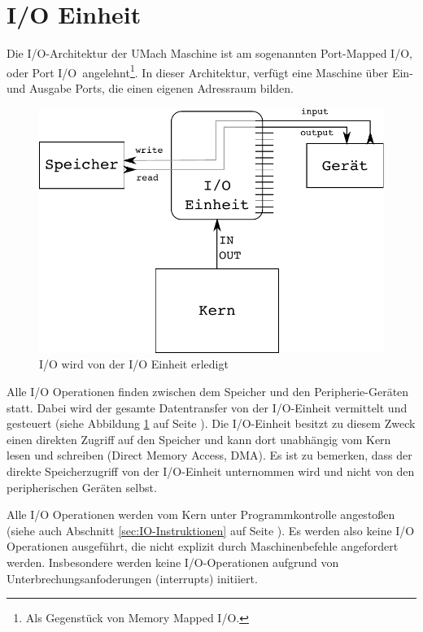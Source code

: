 \section{I/O Einheit}
\label{sec:IO-Einheit}

Die I/O-Architektur der UMach Maschine ist am sogenannten \glqq Port-Mapped
I/O\grqq, oder \glqq Port I/O\grqq\ angelehnt\footnote{Als Gegenstück von \glqq
Memory Mapped I/O\grqq.}. In dieser Architektur, verfügt eine Maschine über
Ein- und Ausgabe \glqq Ports\grqq, die einen eigenen Adressraum bilden.

\begin{figure}[htp]
 \centering
 \includegraphics{./img/UMach-IO-Prozess.pdf}
 \caption{I/O wird von der I/O Einheit erledigt}
 \label{fig:UMach-IO-Prozess}
\end{figure}

Alle I/O Operationen finden zwischen dem Speicher und den Peripherie-Geräten
statt. Dabei wird der gesamte Datentransfer von der I/O-Einheit vermittelt und
gesteuert (siehe Abbildung \ref{fig:UMach-IO-Prozess} auf Seite
\pageref{fig:UMach-IO-Prozess}). Die I/O-Einheit besitzt zu diesem Zweck einen
direkten Zugriff auf den Speicher und kann dort unabhängig vom Kern lesen und
schreiben (Direct Memory Access, DMA). Es ist zu bemerken, dass
der direkte Speicherzugriff von der I/O-Einheit unternommen wird und nicht von
den peripherischen Geräten selbst.

Alle I/O Operationen werden vom Kern unter Programmkontrolle angestoßen (siehe
auch Abschnitt \ref{sec:IO-Instruktionen} auf Seite
\pageref{sec:IO-Instruktionen}). Es werden also keine I/O Operationen
ausgeführt, die nicht explizit durch Maschinenbefehle angefordert werden.
Insbesondere werden keine I/O-Operationen aufgrund von
Unterbrechungsanfoderungen (interrupts) initiiert.

